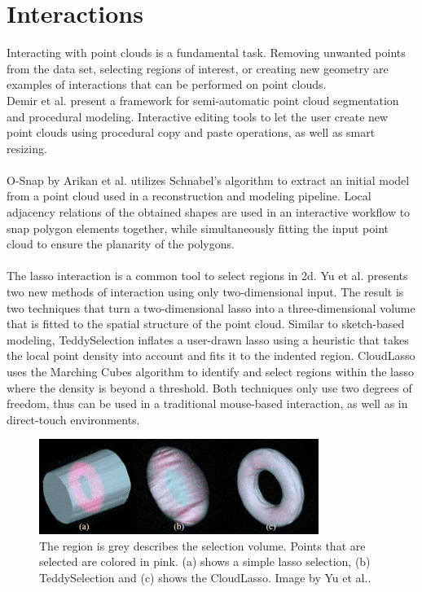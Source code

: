 \section {Interactions}
\label{sec:related_work_interactions}

Interacting with point clouds is a fundamental task. Removing unwanted points from the data set, selecting regions of interest, or creating new geometry are examples of interactions that can be performed on point clouds. 
\\
Demir et al.\cite{demir2015procedural} present a framework for semi-automatic point cloud segmentation and procedural modeling. Interactive editing tools to let the user create new point clouds using procedural copy and paste operations, as well as smart resizing. 
\\
\\
O-Snap by Arikan et al. \cite{arikan-2013-osn} utilizes Schnabel's algorithm to extract an initial model from a point cloud used in a reconstruction and modeling pipeline. Local adjacency relations of the obtained shapes are used in an interactive workflow to snap polygon elements together, while simultaneously fitting the input point cloud to ensure the planarity of the polygons. 
\\
\\
The lasso interaction is a common tool to select regions in 2d. Yu et al.\cite{yu2012efficient} presents two new methods of interaction using only two-dimensional input. The result is two techniques that turn a two-dimensional lasso into a three-dimensional volume that is fitted to the spatial structure of the point cloud. Similar to sketch-based modeling\cite{igarashi2007teddy}, TeddySelection inflates a user-drawn lasso using a heuristic that takes the local point density into account and fits it to the indented region. CloudLasso uses the Marching Cubes algorithm\cite{lorensen1987marching} to identify and select regions within the lasso where the density is beyond a threshold. Both techniques only use two degrees of freedom, thus can be used in a traditional mouse-based interaction, as well as in direct-touch environments. 

\begin{figure}[h]
    \centering
    \includegraphics[width=0.81\textwidth]{Related_Work/teddyCloudSelection.png}%
    \caption{The region is grey describes the selection volume. Points that are selected are colored in pink. (a) shows a simple lasso selection, (b) TeddySelection and (c) shows the CloudLasso. Image by Yu et al.\cite{yu2012efficient}.}
    \label{fig:teddyCloudSelection}
\end{figure}

